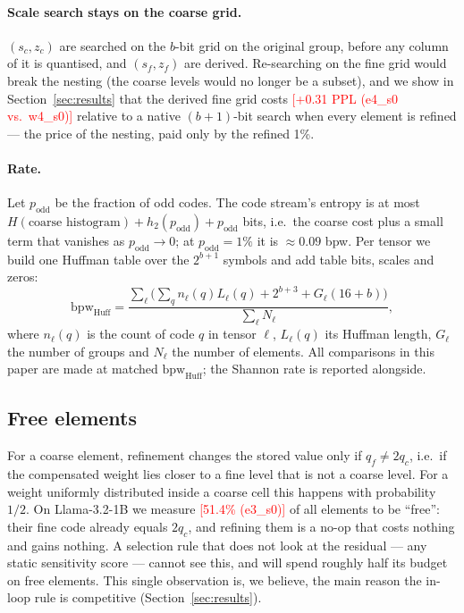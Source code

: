 \documentclass{article}
\newcommand{\tbd}[1]{\textcolor{red}{[#1]}}
\newcommand{\bpw}{\mathrm{bpw}}
\begin{document}
\paragraph{Scale search stays on the coarse grid.} $(s_c, z_c)$ are
searched on the $b$-bit grid on the original group, before any column of
it is quantised, and $(s_f, z_f)$ are derived. Re-searching on the fine
grid would break the nesting (the coarse levels would no longer be a
subset), and we show in Section~\ref{sec:results} that the derived fine
grid costs \tbd{+0.31 PPL (e4\_s0 vs.\ w4\_s0)} relative to a native
$(b{+}1)$-bit search when every element is refined --- the price of the
nesting, paid only by the refined 1\%.

\paragraph{Rate.} Let $p_{\mathrm{odd}}$ be the fraction of odd codes.
The code stream's entropy is at most $H(\text{coarse histogram}) +
h_2(p_{\mathrm{odd}}) + p_{\mathrm{odd}}$ bits, i.e.\ the coarse cost plus
a small term that vanishes as $p_{\mathrm{odd}}\to 0$; at
$p_{\mathrm{odd}} = 1\%$ it is $\approx 0.09$ bpw. Per tensor we build
one Huffman table over the $2^{b+1}$ symbols and add table bits, scales
and zeros:
\begin{equation}
  \bpw_{\mathrm{Huff}} = \frac{\sum_\ell\Big(\sum_q n_\ell(q) L_\ell(q) +
  2^{b+3} + G_\ell (16+b)\Big)}{\sum_\ell N_\ell},
  \label{eq:rate}
\end{equation}
where $n_\ell(q)$ is the count of code $q$ in tensor $\ell$, $L_\ell(q)$
its Huffman length, $G_\ell$ the number of groups and $N_\ell$ the
number of elements. All comparisons in this paper are made at matched
$\bpw_{\mathrm{Huff}}$; the Shannon rate is reported alongside.

\subsection{Free elements}
\label{sec:free}

For a coarse element, refinement changes the stored value only if $q_f
\neq 2q_c$, i.e.\ if the compensated weight lies closer to a fine level
that is not a coarse level. For a weight uniformly distributed inside a
coarse cell this happens with probability $1/2$. On Llama-3.2-1B we
measure \tbd{51.4\% (e3\_s0)} of all elements to be ``free'': their
fine code already equals $2q_c$, and refining them is a no-op that costs
nothing and gains nothing. A selection rule that does not look at the
residual --- any static sensitivity score --- cannot see this, and will
spend roughly half its budget on free elements. This single observation
is, we believe, the main reason the in-loop rule is competitive
(Section~\ref{sec:results}).
\end{document}
